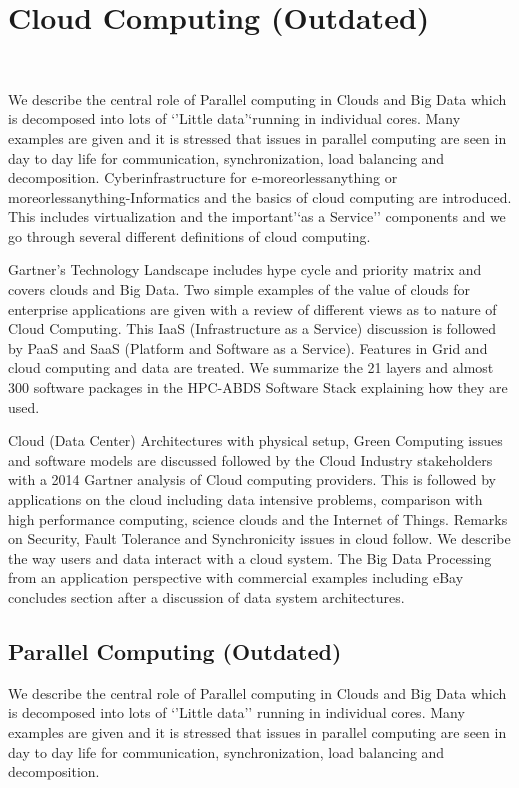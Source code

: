 

\chapter{Cloud Computing (Outdated)}

\FILENAME\

We describe the central role of Parallel computing in Clouds and Big
Data which is decomposed into lots of `'Little data'`running in
individual cores. Many examples are given and it is stressed that issues
in parallel computing are seen in day to day life for communication,
synchronization, load balancing and decomposition. Cyberinfrastructure
for e-moreorlessanything or moreorlessanything-Informatics and the
basics of cloud computing are introduced. This includes virtualization
and the important'`as a Service'' components and we go through several
different definitions of cloud computing.

Gartner's Technology Landscape includes hype cycle and priority matrix
and covers clouds and Big Data. Two simple examples of the value of
clouds for enterprise applications are given with a review of different
views as to nature of Cloud Computing. This IaaS (Infrastructure as a
Service) discussion is followed by PaaS and SaaS (Platform and Software
as a Service). Features in Grid and cloud computing and data are
treated. We summarize the 21 layers and almost 300 software packages in
the HPC-ABDS Software Stack explaining how they are used.

Cloud (Data Center) Architectures with physical setup, Green Computing
issues and software models are discussed followed by the Cloud Industry
stakeholders with a 2014 Gartner analysis of Cloud computing providers.
This is followed by applications on the cloud including data intensive
problems, comparison with high performance computing, science clouds and
the Internet of Things. Remarks on Security, Fault Tolerance and
Synchronicity issues in cloud follow. We describe the way users and data
interact with a cloud system. The Big Data Processing from an
application perspective with commercial examples including eBay
concludes section after a discussion of data system architectures.

\section{Parallel Computing (Outdated)}

We describe the central role of Parallel computing in Clouds and Big
Data which is decomposed into lots of `'Little data'' running in
individual cores. Many examples are given and it is stressed that issues
in parallel computing are seen in day to day life for communication,
synchronization, load balancing and decomposition.

